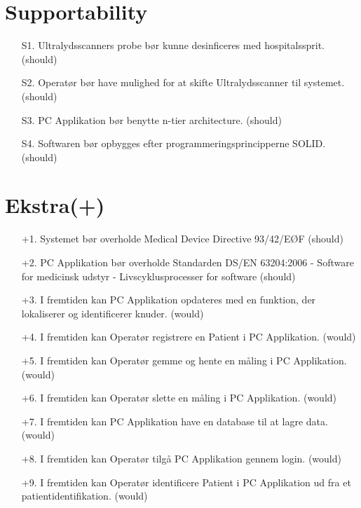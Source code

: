 \section{Supportability}
\begin{enumerate}
    \item[S1.] Ultralydsscanners probe bør kunne desinficeres med hospitalssprit. (should)
    \item[S2.] Operatør bør have mulighed for at skifte Ultralydsscanner til systemet. (should)
    \item[S3.] PC Applikation bør benytte n-tier architecture. (should)
    \item[S4.] Softwaren bør opbygges efter programmeringsprincipperne SOLID. (should)
\end{enumerate}
\section{Ekstra(+)}\label{andrePlus}

\begin{enumerate}
	\item[+1.] Systemet bør overholde Medical Device Directive 93/42/EØF \cite{MDD} (should)
	\item[+2.] PC Applikation bør overholde Standarden DS/EN 63204:2006 - Software for medicinsk udstyr - Livscyklusprocesser for software \cite{software} (should)
    \item[+3.] I fremtiden kan PC Applikation opdateres med en funktion, der lokaliserer og identificerer knuder. (would)
    \item[+4.] I fremtiden kan Operatør registrere en Patient i PC Applikation. (would) 
    \item[+5.] I fremtiden kan Operatør gemme og hente en måling i PC Applikation. (would)  
    \item[+6.] I fremtiden kan Operatør slette en måling i PC Applikation. (would)
    \item[+7.] I fremtiden kan PC Applikation have en database til at lagre data. (would)
    \item[+8.] I fremtiden kan Operatør tilgå PC Applikation gennem login. (would) 
    \item[+9.] I fremtiden kan Operatør identificere Patient i PC Applikation ud fra et patientidentifikation. (would)
\end{enumerate}
